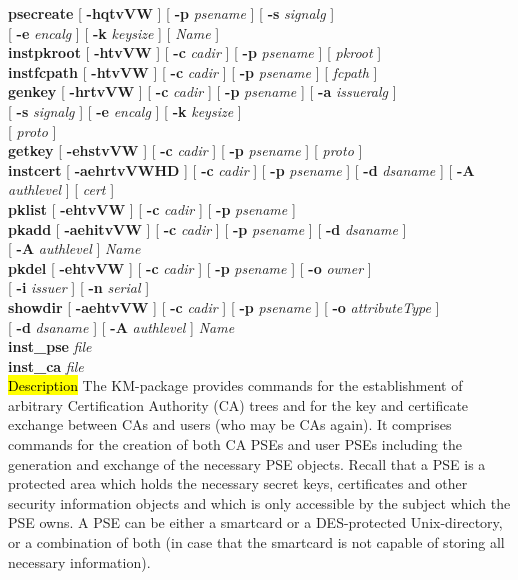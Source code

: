 {\bf psecreate} [ {\bf -hqtvVW} ] [ {\bf -p} {\em psename} ] [ {\bf -s} {\em signalg} ] 
             \\ \hspace*{1.5cm} [ {\bf -e} {\em encalg} ] [ {\bf -k} {\em keysize} ] [ {\em Name} ] \\ 
{\bf instpkroot} [ {\bf -htvVW} ] [ {\bf -c} {\em cadir} ] [ {\bf -p} {\em psename} ] [ {\em pkroot} ] \\
{\bf instfcpath} [ {\bf -htvVW} ] [ {\bf -c} {\em cadir} ] [ {\bf -p} {\em psename} ] [ {\em fcpath} ] \\
{\bf genkey} [ {\bf -hrtvVW} ] [ {\bf -c} {\em cadir} ] [ {\bf -p} {\em psename} ] [ {\bf -a} {\em issueralg} ] \\
\hspace*{1.6cm} [ {\bf -s} {\em signalg} ] [ {\bf -e} {\em encalg} ] [ {\bf -k} {\em keysize} ] \\ 
\hspace*{1.6cm} [ {\em proto} ] \\
{\bf getkey} [ {\bf -ehstvVW} ] [ {\bf -c} {\em cadir} ] [ {\bf -p} {\em psename} ] [ {\em proto} ] 
\\
{\bf instcert} [ {\bf -aehrtvVWHD} ] [ {\bf -c} {\em cadir} ] [ {\bf -p} {\em psename} ] [ {\bf -d} {\em dsaname} ] [ {\bf -A} {\em authlevel} ] [ {\em cert} ] \\
{\bf pklist} [ {\bf -ehtvVW} ] [ {\bf -c} {\em cadir} ] [ {\bf -p} {\em psename} ] \\
{\bf pkadd} [ {\bf -aehitvVW} ] [ {\bf -c} {\em cadir} ] [ {\bf -p} {\em psename} ] [ {\bf -d} {\em dsaname} ] \\
\hspace*{1.6cm} [ {\bf -A} {\em authlevel} ] {\em Name} \\
{\bf pkdel} [ {\bf -ehtvVW} ] [ {\bf -c} {\em cadir} ] [ {\bf -p} {\em psename} ] [ {\bf -o} {\em owner} ] \\
\hspace*{1.6cm} [ {\bf -i} {\em issuer} ] [ {\bf -n} {\em serial} ] \\
{\bf showdir} [ {\bf -aehtvVW} ] [ {\bf -c} {\em cadir} ] [ {\bf -p} {\em psename} ] [ {\bf -o} {\em attributeType} ] \\ \hspace*{1.6cm} [ {\bf -d} {\em dsaname} ] [ {\bf -A} {\em authlevel} ] {\em Name} \\
{\bf inst\_pse} {\em file} \\
{\bf inst\_ca} {\em file} \\
\hl{Description}
The KM-package provides commands for the establishment of arbitrary Certification Authority (CA) trees 
and for the key and certificate exchange between CAs and users (who may be CAs again). 
It comprises commands for the creation of both CA PSEs and user PSEs
including the generation and exchange of the necessary PSE objects. Recall that a PSE is
a protected area which holds the necessary secret keys, certificates and other security
information objects and which is only accessible by the subject which the PSE owns. A PSE
can be either a smartcard or a DES-protected Unix-directory, or a combination of both (in
case that the smartcard is not capable of storing all necessary information).

